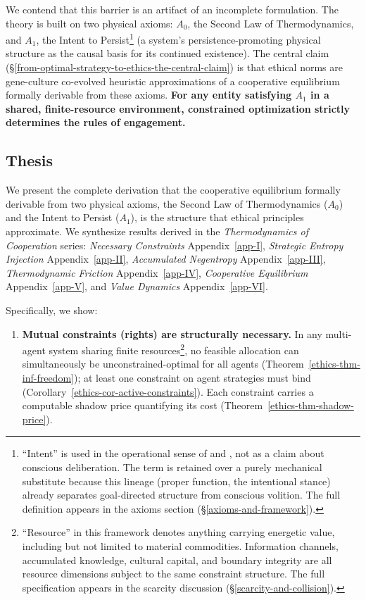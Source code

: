 \documentclass[11pt]{article}
\theoremstyle{plain}
\theoremstyle{definition}
\theoremstyle{remark}
\let\origsubsection\subsection
\renewcommand{\subsection}{\needspace{7\baselineskip}\origsubsection}
\providecommand{\tightlist}{%
  \setlength{\itemsep}{0pt}\setlength{\parskip}{0pt}}
\begin{document}
We contend that this barrier is an artifact of an incomplete
formulation. The theory is built on two physical axioms: \(A_0\), the
Second Law of Thermodynamics, and \(A_1\), the Intent to
Persist\footnote{``Intent'' is used in the operational sense of
  \citet{Millikan1984} and \citet{Dennett1987}, not as a claim about
  conscious deliberation. The term is retained over a purely mechanical
  substitute because this lineage (proper function, the intentional
  stance) already separates goal-directed structure from conscious
  volition. The full definition appears in the axioms section
  (§\ref{axioms-and-framework}).} (a system's persistence-promoting
physical structure as the causal basis for its continued existence). The
central claim (§\ref{from-optimal-strategy-to-ethics-the-central-claim})
is that ethical norms are gene-culture co-evolved heuristic
approximations of a cooperative equilibrium formally derivable from
these axioms. \textbf{For any entity satisfying \(A_1\) in a shared,
finite-resource environment, constrained optimization strictly
determines the rules of engagement.}

\subsection{Thesis}\label{thesis}

We present the complete derivation that the cooperative equilibrium
formally derivable from two physical axioms, the Second Law of
Thermodynamics (\(A_0\)) and the Intent to Persist (\(A_1\)), is the
structure that ethical principles approximate. We synthesize results
derived in the \emph{Thermodynamics of Cooperation} series:
\emph{Necessary Constraints} Appendix~\ref{app-I}, \emph{Strategic
Entropy Injection} Appendix~\ref{app-II}, \emph{Accumulated Negentropy}
Appendix~\ref{app-III}, \emph{Thermodynamic Friction}
Appendix~\ref{app-IV}, \emph{Cooperative Equilibrium}
Appendix~\ref{app-V}, and \emph{Value Dynamics} Appendix~\ref{app-VI}.

Specifically, we show:

\begin{enumerate}
\def\labelenumi{\arabic{enumi}.}
\tightlist
\item
  \textbf{Mutual constraints (rights) are structurally necessary.} In
  any multi-agent system sharing finite resources\footnote{``Resource''
    in this framework denotes anything carrying energetic value,
    including but not limited to material commodities. Information
    channels, accumulated knowledge, cultural capital, and boundary
    integrity are all resource dimensions subject to the same constraint
    structure. The full specification appears in the scarcity discussion
    (§\ref{scarcity-and-collision}).}, no feasible allocation can
  simultaneously be unconstrained-optimal for all agents
  (Theorem~\ref{ethics-thm-inf-freedom}); at least one constraint on
  agent strategies must bind
  (Corollary~\ref{ethics-cor-active-constraints}). Each constraint
  carries a computable shadow price quantifying its cost
  (Theorem~\ref{ethics-thm-shadow-price}).
\end{enumerate}
\end{document}
